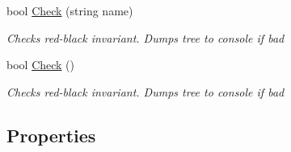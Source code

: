 \begin{DoxyCompactItemize}
bool \hyperlink{class_c5_1_1_tree_bag_aa8bc26a8a2fd991db298572667ba52b7}{Check} (string name)
\begin{DoxyCompactList}\small\item\em Checks red-\/black invariant. Dumps tree to console if bad \end{DoxyCompactList}\item 
bool \hyperlink{class_c5_1_1_tree_bag_a6524f8d95ca06232a45aa7c72a43d6cf}{Check} ()
\begin{DoxyCompactList}\small\item\em Checks red-\/black invariant. Dumps tree to console if bad \end{DoxyCompactList}\end{DoxyCompactItemize}
\subsection*{Properties}
